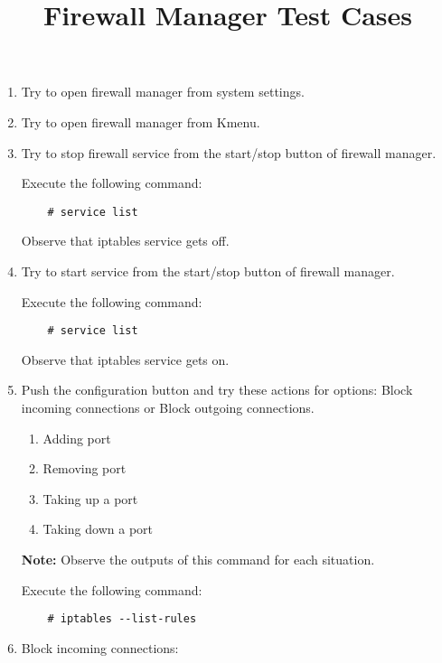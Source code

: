 \documentclass[a4paper,10pt]{article}
\title{Firewall Manager Test Cases}
\begin{document}
\maketitle

\begin{enumerate}
    \item Try to open firewall manager from system settings.
    \item Try to open firewall manager from Kmenu.
    \item Try to stop firewall service from the start/stop button of firewall manager.

    Execute the following command:

\begin{verbatim}
    # service list
\end{verbatim} 

    Observe that iptables service gets off.

    \item Try to start service from the start/stop button of firewall manager.

        Execute the following command:

\begin{verbatim}
    # service list
\end{verbatim}

       Observe that iptables service gets on.

\item Push the configuration button and try these actions for options: Block incoming connections or Block outgoing connections.
    \begin{enumerate}
        \item Adding  port
        \item Removing port
        \item Taking up a port
        \item Taking down a port
    \end{enumerate}

\textbf{Note:} Observe the outputs of this command for each situation.

Execute the following command:

\begin{verbatim}
    # iptables --list-rules
\end{verbatim} 

\item Block incoming connections:


\end{enumerate}
\end{document}
